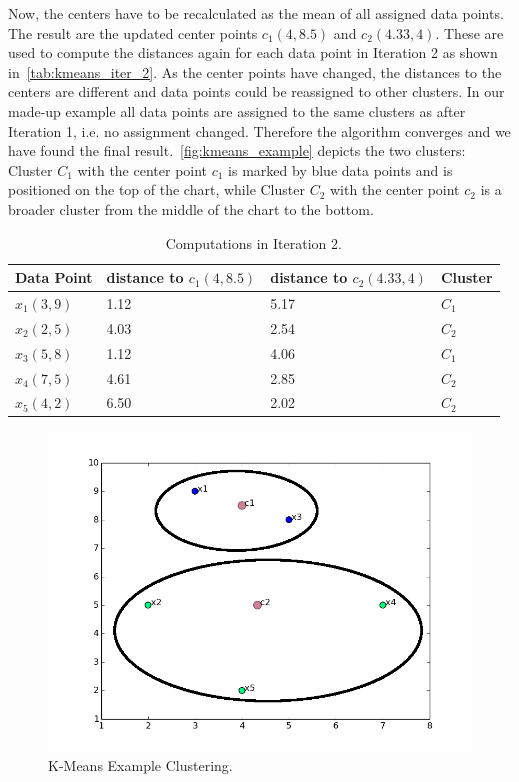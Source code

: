 Now, the centers have to be recalculated as the mean of all assigned data points. The result are the updated center points $c_1(4,8.5)$ and $c_2(4.33,4)$. These are used to compute the distances again for each data point in Iteration 2 as shown in~\autoref{tab:kmeans_iter_2}. As the center points have changed, the distances to the centers are different and data points could be reassigned to other clusters. In our made-up example all data points are assigned to the same clusters as after Iteration 1, i.e. no assignment changed. Therefore the algorithm converges and we have found the final result.~\autoref{fig:kmeans_example} depicts the two clusters: Cluster $C_1$ with the center point $c_1$ is marked by blue data points and is positioned on the top of the chart, while Cluster $C_2$ with the center point $c_2$ is a broader cluster from the middle of the chart to the bottom.

\begin{table}[htsb]
  \caption[Computations in Iteration 2]{Computations in Iteration 2.}\label{tab:kmeans_iter_2}
  \centering
  \begin{tabular}{l l l l}
    \toprule
      Data Point & distance to $c_1(4,8.5)$ & distance to $c_2(4.33,4)$ & Cluster \\
    \midrule
        $x_1(3,9)$ & 1.12 & 5.17 & $C_1$ \\
        $x_2(2,5)$ & 4.03 & 2.54 & $C_2$ \\
        $x_3(5,8)$ & 1.12 & 4.06 & $C_1$ \\
        $x_4(7,5)$ & 4.61 & 2.85 & $C_2$ \\
        $x_5(4,2)$ & 6.50 & 2.02 & $C_2$ \\
    \bottomrule
  \end{tabular}
\end{table}


\begin{figure}[htsb]
  \centering
  \includegraphics[scale=0.5, trim="0cm 1cm 0cm 0cm"]{figures/kmeans_example2}
  \caption[K-Means Example Clustering]{K-Means Example Clustering.}\label{fig:kmeans_example}
\end{figure}

